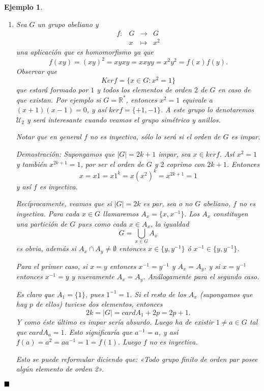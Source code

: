 \documentclass[12pt]{article}
\newtheorem{example}{Ejemplo}[theorem]
\begin{document}
\begin{example}
\begin{enumerate}
\item Sea $G$ un grupo abeliano y $$\begin{array}{rccl}
f\colon &G & \longrightarrow & G\\
&x& \longmapsto &x^{2}
\end{array}
$$ una aplicación que es homomorfismo ya que $$f(xy) = (xy)^{2} = xyxy = xxyy = x^{2}y^{2} = f(x)f(y).$$
Observar que $$Ker f = \lbrace x \in G : x^{2} = 1\rbrace$$ que estará formado por $1$ y todos los elementos de orden $2$ de $G$ en caso de que existan. Por ejemplo si $G = \mathbb{R}^{\ast}$, entonces $x^{2} = 1$ equivale a $(x+1)(x-1) = 0$, y así $ker f = \lbrace +1,-1\rbrace$. A este grupo lo denotaremos $\mathcal{U}_{2}$ y será interesante cuando veamos el \textit{grupo simétrico} y anillos.

Notar que en general $f$ no es inyectiva, sólo lo será si el orden de $G$ es impar.

\emph{Demostración: } Supongamos que $|G| = 2k+1$ impar, sea $x \in ker f$. Así $x^{2} = 1$ y también $x^{2k+1} = 1$, por ser el orden de $G$ y $2$ coprimo con $2k+1$. Entonces $$x = x1 = x1^{k} = x(x^{2})^{k} = x^{2k+1} = 1$$ y así $f$ es inyectiva.

Recíprocamente, veamos que si $|G| = 2k$ es par, sea o no $G$ abeliano, $f$ no es inyectiva. Para cada $x \in G$ llamaremos $A_{x} = \lbrace x, x^{-1}\rbrace.$ Los $A_{x}$ constituyen una partición de $G$ pues como cada $x \in A_{x}$, la igualdad $$G = \bigcup_{x \in G} A_{x}$$ es obvia, además si $A_{x}\cap A_{y} \neq \emptyset$ entonces $x \in \lbrace y, y^{-1}\rbrace$ ó $x^{-1} \in \lbrace y,y^{-1}\rbrace$.

Para el primer caso, si $x = y$ entonces $x^{-1} = y^{-1}$ y $A_{x} = A_{y}$, y si $x = y^{-1}$ entonces $x^{-1} = y$ y nuevamente $A_{x} = A_{y}$. Análogamente para el segundo caso.

Es claro que $A_{1} = \lbrace 1 \rbrace$, pues $1^{-1} = 1$. Si el resto de los $A_{x}$ (supongamos que hay $p$ de ellos) tuviese dos elementos, entonces $$2k = |G| = card A_{1} + 2p = 2p +1.$$ Y como éste último es impar sería absurdo. Luego ha de existir $1 \neq a \in G$ tal que $card A_{a} = 1$. Esto significaría que $a^{-1} = a$, y así $f(a) = a^{2} = aa^{-1} = 1 = f(1)$. Luego $f$ no es inyectiva.

Esto se puede reformular diciendo que: \textit{«Todo grupo finito de orden par posee algún elemento de orden 2»}. 
\end{enumerate}
\end{example}
$\hfill \blacksquare$
\end{document}
